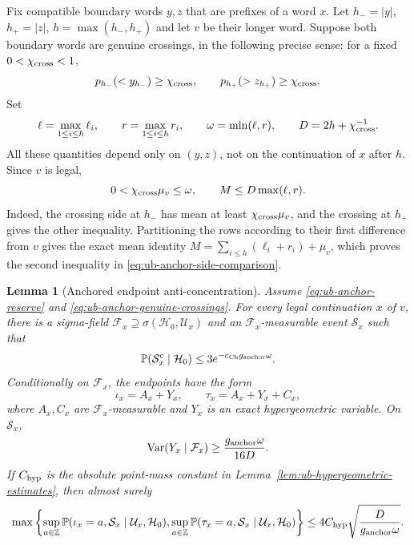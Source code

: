 \documentclass[11pt]{article}
\numberwithin{equation}{section}
\newtheorem{lemma}[lemma]{Lemma}
\newcommand{\Pp}{\mathbb P}
\newcommand{\Var}{\operatorname{Var}}
\newcommand{\1}{\mathbf 1}
\begin{document}
Fix compatible boundary words $y,z$ that are prefixes of a word $x$.
Let $h_- = |y|$, $h_+=|z|$, $h=\max(h_-,h_+)$ and let $v$ be their
longer word.  Suppose both boundary words are genuine crossings, in
the following precise sense: for a fixed $0<\chi_{\rm cross}<1$,
\begin{equation}
\label{eq:ub-anchor-genuine-crossings}
 p_{h_-}(<y_{h_-})\ge\chi_{\rm cross},\qquad
 p_{h_+}(>z_{h_+})\ge\chi_{\rm cross}.
\end{equation}
Set
\begin{equation}
\label{eq:ub-anchor-side-scales}
 \ell=\max_{1\le i\le h}\ell_i,\qquad
 r=\max_{1\le i\le h}r_i,\qquad
 \omega=\min(\ell,r),\qquad
 D=2h+\chi_{\rm cross}^{-1}.
\end{equation}
All these quantities depend only on $(y,z)$, not on the continuation
of $x$ after $h$.  Since $v$ is legal,
\begin{equation}
\label{eq:ub-anchor-side-comparison}
 0<\chi_{\rm cross}\mu_v\le\omega,
 \qquad M\le D\max(\ell,r).
\end{equation}
Indeed, the crossing side at $h_-$ has mean at least
$\chi_{\rm cross}\mu_v$, and the crossing at $h_+$ gives the other
inequality.  Partitioning the rows according to their first difference
from $v$ gives the exact mean identity
$M=\sum_{i\le h}(\ell_i+r_i)+\mu_v$, which proves the second
inequality in \eqref{eq:ub-anchor-side-comparison}.

\begin{lemma}[Anchored endpoint anti-concentration]
\label{lem:ub-anchor-endpoint-atoms}
Assume \eqref{eq:ub-anchor-reserve} and
\eqref{eq:ub-anchor-genuine-crossings}.  For every legal continuation
$x$ of $v$, there is a sigma-field
$\mathcal F_x\supseteq\sigma(\mathcal H_0,\mathcal U_x)$ and an
$\mathcal F_x$-measurable event $\mathcal S_x$ such that
\begin{equation}
\label{eq:ub-anchor-smoothing-failure}
 \Pp(\mathcal S_x^c\mid\mathcal H_0)
 \le3e^{-c_{\rm Ch}g_{\rm anchor}\omega}.
\end{equation}
Conditionally on $\mathcal F_x$, the endpoints have the form
\begin{equation}
\label{eq:ub-anchor-endpoint-shift}
 \iota_x=A_x+Y_x,\qquad \tau_x=A_x+Y_x+C_x,
\end{equation}
where $A_x,C_x$ are $\mathcal F_x$-measurable and $Y_x$ is an exact
hypergeometric variable.  On $\mathcal S_x$,
\begin{equation}
\label{eq:ub-anchor-variance}
 \Var(Y_x\mid\mathcal F_x)
 \ge\frac{g_{\rm anchor}\omega}{16D}.
\end{equation}
If $C_{\rm hyp}$ is the absolute point-mass constant in
Lemma~\ref{lem:ub-hypergeometric-estimates}, then almost surely
\begin{equation}
\label{eq:ub-anchor-conditional-atoms}
 \max\left\{
 \sup_{a\in\mathbb Z}\Pp(\iota_x=a,\mathcal S_x\mid\mathcal U_x,\mathcal H_0),
 \sup_{a\in\mathbb Z}\Pp(\tau_x=a,\mathcal S_x\mid\mathcal U_x,\mathcal H_0)
 \right\}
 \le4C_{\rm hyp}\sqrt{\frac{D}{g_{\rm anchor}\omega}}.
\end{equation}
\end{lemma}
\end{document}
